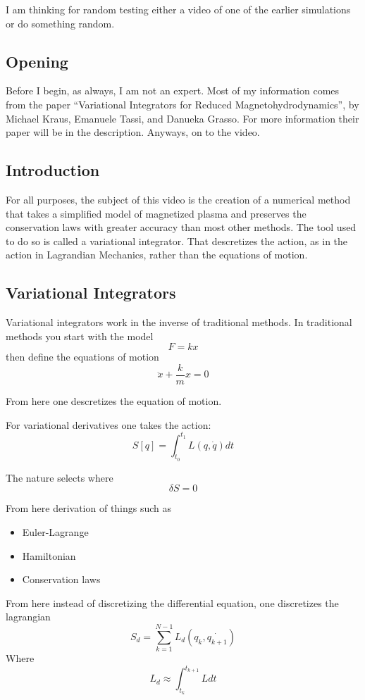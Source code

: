 I am thinking for random testing either a video of one of the earlier simulations or do something random.


\subsection{Opening}

Before I begin, as always, I am not an expert. Most of my information comes from the paper ``Variational Integrators for Reduced Magnetohydrodynamics'', by Michael Kraus, Emanuele Tassi, and Danueka Grasso. For more information their paper will be in the description. Anyways, on to the video.

\subsection{Introduction}

For all purposes, the subject of this video is the creation of a numerical method that takes a simplified model of magnetized plasma and preserves the conservation laws with greater accuracy than most other methods. The tool used to do so is called a variational integrator. That descretizes the action, as in the action in Lagrandian Mechanics, rather than the equations of motion.
\subsection{Variational Integrators}
Variational integrators work in the inverse of traditional methods. In traditional methods you start with the model
\[
	F = kx
\]
then define the equations of motion
\[
	\ddot{x} + \frac{k}{m}x = 0
\]

From here one descretizes the equation of motion.

For variational derivatives one takes the action:
\[
	S[q] = \int_{t_0}^{t_1} L(q, \dot{q}) dt
\]

The nature selects where
\[
	\delta S = 0
\]

From here derivation of things such as
\begin{itemize}
	\item Euler-Lagrange
	\item Hamiltonian
	\item Conservation laws
\end{itemize}
From here instead of discretizing the differential equation, one discretizes the lagrangian
\[
	S_d = \sum_{k=1}^{N-1} L_d(q_k, \dot{q_{k+1}})
\]
Where
\[
	L_d \approx \int_{t_k}^{t_{k+1}}L dt
\]

